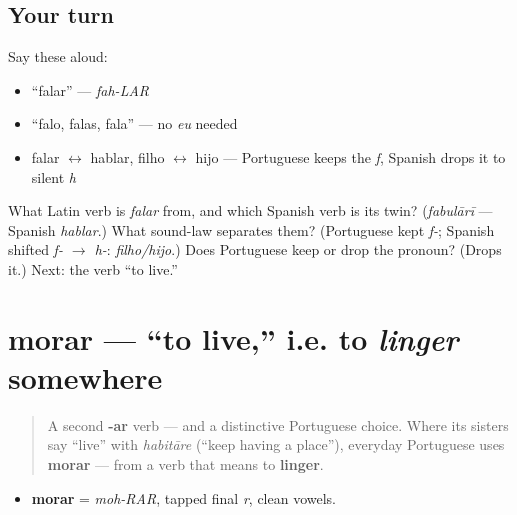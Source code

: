 \subsection*{Your turn}
Say these aloud:

\begin{itemize}
\raggedright
  \item \textquotedblleft{}falar\textquotedblright{} — \emph{fah-LAR}
  \item \textquotedblleft{}falo, falas, fala\textquotedblright{} — no \emph{eu} needed
  \item falar $\leftrightarrow$ hablar, filho $\leftrightarrow$ hijo — Portuguese keeps the \emph{f}, Spanish drops it to silent \emph{h}
\end{itemize}

\begin{tcolorbox}[breakable,colback=teal!4,colframe=teal!35!black,title={Before you move on}]
What Latin verb is \emph{falar} from, and which Spanish verb is its twin? (\emph{fabulārī} — Spanish \emph{hablar}.) What sound-law separates them? (Portuguese kept \emph{f-}; Spanish shifted \emph{f- $\to$ h-}: \emph{filho/hijo}.) Does Portuguese keep or drop the pronoun? (Drops it.) Next: the verb \textquotedblleft{}to live.\textquotedblright{}
\end{tcolorbox}
\section[morar]{morar — \textquotedblleft{}to live,\textquotedblright{} i.e. to \emph{linger} somewhere}

\label{lesson:PT-C05-morar}



\begin{quote}
A second \textbf{-ar} verb — and a distinctive Portuguese choice. Where its sisters say \textquotedblleft{}live\textquotedblright{} with \emph{habitāre} (\textquotedblleft{}keep having a place\textquotedblright{}), everyday Portuguese uses \textbf{morar} — from a verb that means to \textbf{linger}.
\end{quote}

\begin{sounds}
\begin{itemize}
\raggedright
  \item \textbf{morar} = \emph{moh-RAR}, tapped final \emph{r}, clean vowels.
\end{itemize}
\end{sounds}

